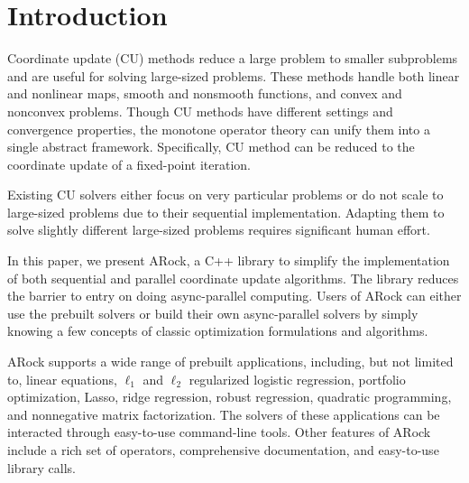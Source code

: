 \section{Introduction}
Coordinate update (CU) methods reduce a large problem to smaller subproblems and are useful for solving large-sized problems.
These methods handle both linear and nonlinear maps, smooth and nonsmooth functions, and convex and nonconvex problems. 
Though CU methods have different settings and convergence properties,  the monotone operator theory can unify them into a single abstract framework. 
Specifically, CU method can be reduced to the coordinate update of a fixed-point iteration. 

Existing CU solvers \citep{hsieh2015passcode,jaggi2014communication,recht2011hogwild} either focus on very particular problems or do not scale to large-sized problems due to their sequential implementation. 
Adapting them to solve slightly different large-sized problems requires significant human effort. 

In this paper, we present ARock, a C++ library to simplify the implementation of both sequential and parallel coordinate update algorithms. 
The library reduces the barrier to entry on doing async-parallel computing. 
Users of ARock can either use the prebuilt solvers or build their own async-parallel solvers by simply knowing a few concepts of classic optimization formulations and algorithms.

ARock supports a wide range of prebuilt applications, including, but not limited to, 
linear equations, $\ell_1$ and $\ell_2$ regularized logistic regression, portfolio optimization, 
Lasso, ridge regression, robust regression, quadratic programming, and nonnegative matrix factorization. 
The solvers of these applications can be interacted through easy-to-use command-line tools. 
Other features of ARock include a rich set of operators, comprehensive documentation, and easy-to-use library calls.